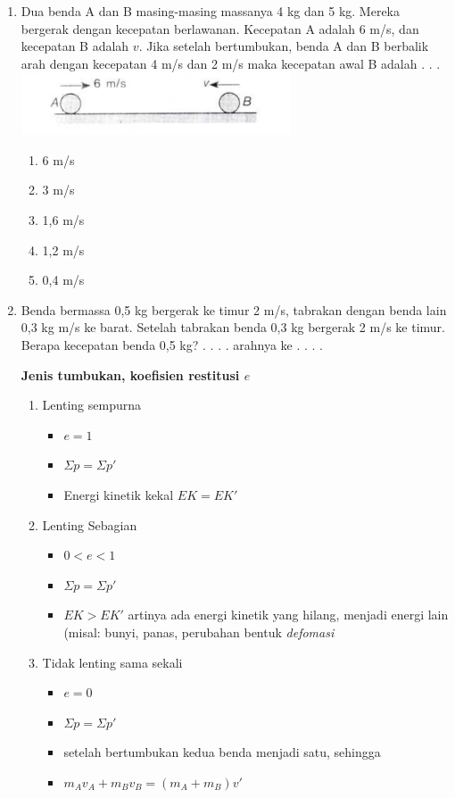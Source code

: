 \documentclass[10pt,a4paper]{extarticle}
\newcommand*\daftar[1]{
\begin{itemize}[label=$\bullet$, itemsep=0pt,topsep=0pt,leftmargin=*] #1 
\end{itemize}}
\newcommand{\pilgani}[1]{                            \vspace{-0.3cm}\begin{multicols}{2}
 \begin{enumerate}[label=\Alph*., itemsep=0pt,topsep=0pt,leftmargin=*,align=Center]#1                     \end{enumerate}
 \phantom{ini cuma sapi, wedus, dan ayam}
 \end{multicols}}
\begin{document}
\begin{multicols*}{2}
\begin{enumerate}
\item Dua benda A dan B masing-masing massanya 4 kg dan 5 kg. Mereka bergerak dengan kecepatan berlawanan. Kecepatan A adalah 6 m/s, dan kecepatan B adalah $v$. Jika setelah bertumbukan, benda A dan B berbalik arah dengan kecepatan 4 m/s dan 2 m/s maka kecepatan awal B adalah . . . 
\includegraphics[width=8cm]{pic/mom1}
\pilgani{
        \item 6 m/s
        \item 3 m/s
        \item 1,6 m/s
        \item 1,2 m/s
        \item 0,4 m/s
        }
\vspace{2cm}

\item Benda bermassa 0,5 kg bergerak ke timur 2 m/s, tabrakan dengan benda lain 0,3 kg m/s ke barat. Setelah tabrakan benda 0,3 kg bergerak 2 m/s ke timur. Berapa kecepatan benda 0,5 kg? . . . . arahnya ke . . . .
\vspace{2cm}


\textbf{Jenis tumbukan, koefisien restitusi $e$}
        \begin{enumerate}
\item Lenting sempurna
     \daftar{
        \item $e =1 $
        \item $\Sigma p = \Sigma p' $
        \item Energi kinetik kekal $EK=EK'$
        }

 \item Lenting Sebagian
        \daftar{
        \item $0<e<1$
        \item $\Sigma p = \Sigma p'$
        \item $EK> EK'$ artinya ada energi kinetik yang hilang, menjadi energi lain (misal: bunyi, panas, perubahan bentuk \textit{defomasi}}

 \item Tidak lenting sama sekali
        \daftar{
        \item $e=0$
        \item $\Sigma p = \Sigma p'$
        \item setelah bertumbukan kedua benda menjadi satu, sehingga 
        \item $m_Av_A + m_Bv_B = (m_A + m_B)v'$
        }
        \end{enumerate}


\end{enumerate}
\end{multicols*}
\end{document}
